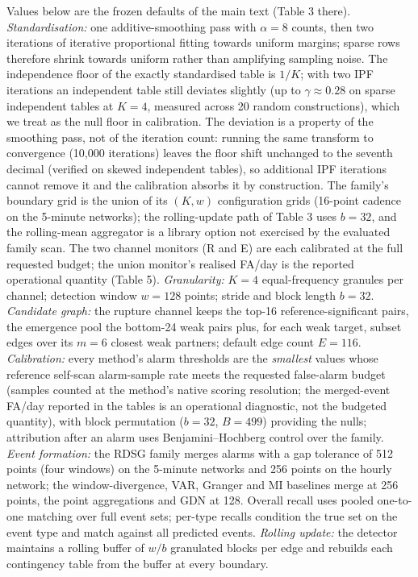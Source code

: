 \documentclass[11pt,a4paper]{article}
\begin{document}
Values below are the frozen defaults of the main text (Table 3 there).
\emph{Standardisation:} one additive-smoothing pass with $\alpha=8$
counts, then two iterations of iterative proportional fitting towards
uniform margins; sparse rows therefore shrink towards uniform rather than
amplifying sampling noise. The independence floor of the exactly
standardised table is $1/K$; with two IPF iterations an independent table
still deviates slightly (up to $\gamma\approx0.28$ on sparse independent
tables at $K{=}4$, measured across 20 random constructions), which we
treat as the null floor in calibration. The deviation is a property of the
smoothing pass, not of the iteration count: running the same transform to
convergence (10{,}000 iterations) leaves the floor shift unchanged to the
seventh decimal (verified on skewed independent tables), so additional IPF
iterations cannot remove it and the calibration absorbs it by construction.
The family's boundary grid is the union of its $(K,w)$
configuration grids (16-point cadence on the 5-minute networks); the
rolling-update path of Table 3 uses $b=32$, and the rolling-mean
aggregator is a library option not exercised by the evaluated family scan.
The two channel monitors (R and E) are each calibrated at the full
requested budget; the union monitor's realised FA/day is the reported
operational quantity (Table 5).
\emph{Granularity:} $K=4$ equal-frequency granules per channel; detection
window $w=128$ points; stride and block length $b=32$. \emph{Candidate
graph:} the rupture channel keeps the top-16 reference-significant pairs,
the emergence pool the bottom-24 weak pairs plus, for each weak target,
subset edges over its $m{=}6$ closest weak partners; default
edge count $E=116$. \emph{Calibration:} every method's alarm thresholds are the \emph{smallest}
values whose reference self-scan alarm-sample rate meets the requested
false-alarm budget (samples counted at the method's native scoring
resolution; the merged-event FA/day reported in the tables is an
operational diagnostic, not the budgeted quantity), with block permutation
($b=32$, $B=499$) providing the nulls; attribution after an alarm uses Benjamini--Hochberg
control over the family. \emph{Event formation:} the RDSG family merges
alarms with a gap tolerance of 512 points (four windows) on the 5-minute
networks and 256 points on the hourly network; the window-divergence, VAR,
Granger and MI baselines merge at 256 points, the point aggregations and GDN
at 128. Overall recall uses pooled one-to-one matching over full event sets;
per-type recalls condition the true set on the event type and match against
all predicted events. \emph{Rolling update:} the
detector maintains a rolling buffer of $w/b$ granulated blocks per edge
and rebuilds each contingency table from the buffer at every boundary.
\end{document}
